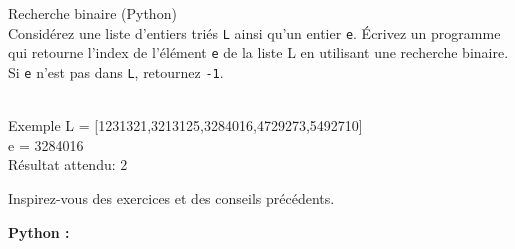 \begin{Exercice}[10 minutes] Recherche binaire (Python)\\

Considérez une liste d’entiers triés \lstinline{L} ainsi qu’un entier \lstinline{e}. Écrivez un programme qui retourne l'index de l'élément \lstinline{e} de la liste L en utilisant une recherche binaire. Si \lstinline{e} n’est pas dans \lstinline{L}, retournez \lstinline{-1}.\\\\

\begin{Example}{\faTerminal \quad Exemple}
    L = [1231321,3213125,3284016,4729273,5492710] \\

    e = 3284016\\

Résultat attendu: 2
\end{Example}



\begin{conseil}
    Inspirez-vous des exercices et des conseils précédents. 
\end{conseil}

    \begin{solution}
        \textbf{Python :}
        
    \end{solution}

\end{Exercice}


